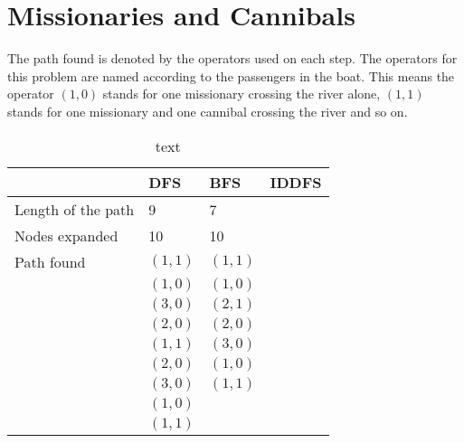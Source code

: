 \section{Missionaries and Cannibals}

The path found is denoted by the operators used on each step.
The operators for this problem are named according to the passengers in the boat.
This means the operator $(1,0)$ stands for one missionary crossing the river alone, $(1,1)$ stands for one missionary and one cannibal crossing the river and so on.


\begin{table}[h]
\centering
\begin{tabular}{|l|l|l|l|}
\hline
	&	DFS	&	BFS	&	IDDFS	\\
\hline
Length of the path	&  9	&  7	&	\\
\hline
Nodes expanded		& 10	& 10	&	\\
\hline
Path found			& $(1,1)$ & $(1,1)$ &   \\
					& $(1,0)$ & $(1,0)$ &   \\
					& $(3,0)$ & $(2,1)$ &   \\
					& $(2,0)$ & $(2,0)$ &   \\
					& $(1,1)$ & $(3,0)$ &   \\
					& $(2,0)$ & $(1,0)$ &   \\
					& $(3,0)$ & $(1,1)$ &   \\
					& $(1,0)$ & &   \\
					& $(1,1)$ & &   \\
\hline

\end{tabular}
\caption{text}
\end{table}